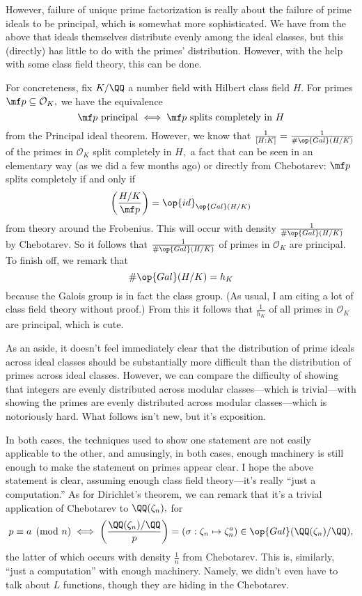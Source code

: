 However, failure of unique prime factorization is really about the failure of prime ideals to be principal, which is somewhat more sophisticated. We have from the above that ideals themselves distribute evenly among the ideal classes, but this (directly) has little to do with the primes' distribution. However, with the help with some class field theory, this can be done.

For concreteness, fix $K/\QQ$ a number field with Hilbert class field $H.$ For primes $\mf p\subseteq\mathcal O_K,$ we have the equivalence
\[\mf p\text{ principal}\iff\mf p\text{ splits completely in }H\]
from the Principal ideal theorem. However, we know that $\frac1{[H:K]}=\frac1{\#\op{Gal}(H/K)}$ of the primes in $\mathcal O_K$ split completely in $H,$ a fact that can be seen in an elementary way (as we did a few months ago) or directly from Chebotarev: $\mf p$ splits completely if and only if
\[\left(\frac{H/K}{\mf p}\right)=\op{id}_{\op{Gal}(H/K)}\]
from theory around the Frobenius. This will occur with density $\frac1{\#\op{Gal}(H/K)}$ by Chebotarev. So it follows that $\frac1{\#\op{Gal}(H/K)}$ of primes in $\mathcal O_K$ are principal. To finish off, we remark that
\[\#\op{Gal}(H/K)=h_K\]
because the Galois group is in fact the class group. (As usual, I am citing a lot of class field theory without proof.) From this it follows that $\frac1{h_K}$ of all primes in $\mathcal O_K$ are principal, which is cute.

As an aside, it doesn't feel immediately clear that the distribution of prime ideals across ideal classes should be substantially more difficult than the distribution of primes across ideal classes. However, we can compare the difficulty of showing that integers are evenly distributed across modular classes---which is trivial---with showing the primes are evenly distributed across modular classes---which is notoriously hard. What follows isn't new, but it's exposition.

In both cases, the techniques used to show one statement are not easily applicable to the other, and amusingly, in both cases, enough machinery is still enough to make the statement on primes appear clear. I hope the above statement is clear, assuming enough class field theory---it's really ``just a computation.'' As for Dirichlet's theorem, we can remark that it's a trivial application of Chebotarev to $\QQ(\zeta_n),$ for
\[p\equiv a\pmod n\iff\left(\frac{\QQ(\zeta_n)/\QQ}p\right)=\left(\sigma:\zeta_n\mapsto\zeta_n^a\right)\in\op{Gal}(\QQ(\zeta_n)/\QQ),\]
the latter of which occurs with density $\frac1n$ from Chebotarev. This is, similarly, ``just a computation'' with enough machinery. Namely, we didn't even have to talk about $L$ functions, though they are hiding in the Chebotarev.

